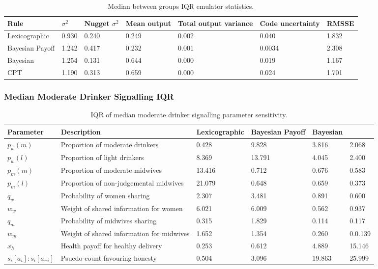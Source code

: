 \begin{table}[h!]
\center
\begin{tabular} {|l | l | l | l | l | l |}
\hline
Rule & \(\sigma^2\) & Nugget \(\sigma^2\) & Mean output & Total output variance & Code uncertainty & RMSSE \\ \hline
Lexicographic & 0.930 & 0.240 & 0.249 & 0.002 & 0.040 & 1.832 \\ \hline
Bayesian Payoff & 1.242 & 0.417 & 0.232 & 0.001 & 0.0034 & 2.308 \\ \hline
Bayesian & 1.254 & 0.131 & 0.644 & 0.000 & 0.019 & 1.167 \\ \hline
\ac{CPT} & 1.190 & 0.313 & 0.659 & 0.000 & 0.024 & 1.701 \\ \hline
\end{tabular}
\caption[Table caption text]{Median between groups IQR emulator statistics. \label{tab:sa_emulator_iqr}}
\end{table}

\subsubsection{Median Moderate Drinker Signalling IQR}

\begin{table}[h!]
\center
\begin{tabular} {|l | l | l | l | l | l |}
\hline
Parameter & Description & Lexicographic & Bayesian Payoff & Bayesian & \ac(CPT) \\ \hline
\(p_{w}(m)\) & Proportion of moderate drinkers & 0.428 & 9.828 & 3.816 & 2.068 \\ \hline
\(p_{w}(l)\) & Proportion of light drinkers & 8.369 & 13.791 & 4.045 & 2.400 \\ \hline
\(p_{m}(m)\) & Proportion of moderate midwives & 13.416 & 0.712 & 0.676 & 0.583 \\ \hline
\(p_{m}(l)\) & Proportion of non-judgemental midwives & 21.079 & 0.648 & 0.659 & 0.373 \\ \hline
\(q_{w}\) & Probability of women sharing & 2.307 & 3.481 & 0.891 & 0.600 \\ \hline
\(w_{w}\) & Weight of shared information for women & 6.021 & 6.009 & 0.562 & 0.937 \\ \hline
\(q_{m}\) & Probability of midwives sharing & 0.315 & 1.829 & 0.114 & 0.117 \\ \hline
\(w_{m}\) & Weight of shared information for midwives & 1.652 & 1.354 & 0.260 & 0.0.139 \\ \hline
\(x_{h}\) & Health payoff for healthy delivery & 0.253 & 0.612 & 4.889 & 15.146 \\ \hline
\(s_{i}[a_{i}]:s_{i}[a_{\neg i}]\) & Psuedo-count favouring honesty & 0.504 & 3.096 & 19.863 & 25.999 \\ \hline
\end{tabular}
\caption[Table caption text]{IQR of median moderate drinker signalling parameter sensitivity. \label{tab:sa_results_sig_iqr}}
\end{table}

